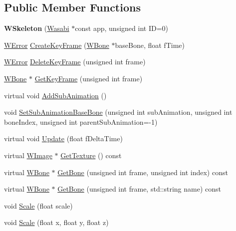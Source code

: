 \subsection*{Public Member Functions}
\begin{DoxyCompactItemize}
\item 
{\bfseries W\+Skeleton} (\hyperlink{class_wasabi}{Wasabi} $\ast$const app, unsigned int ID=0)\hypertarget{class_w_skeleton_ae21c72daeb9f7d5fe33c2a00b0fcf188}{}\label{class_w_skeleton_ae21c72daeb9f7d5fe33c2a00b0fcf188}

\item 
\hyperlink{class_w_error}{W\+Error} \hyperlink{class_w_skeleton_a9e4fbd0755c9e81d18b5c967353585d1}{Create\+Key\+Frame} (\hyperlink{class_w_bone}{W\+Bone} $\ast$base\+Bone, float f\+Time)
\item 
\hyperlink{class_w_error}{W\+Error} \hyperlink{class_w_skeleton_a7ef6ce4bf8ff72030cd9fcaf2657b417}{Delete\+Key\+Frame} (unsigned int frame)
\item 
\hyperlink{class_w_bone}{W\+Bone} $\ast$ \hyperlink{class_w_skeleton_a3f170e9e19601da0967ad54a09fb501f}{Get\+Key\+Frame} (unsigned int frame)
\item 
virtual void \hyperlink{class_w_skeleton_af8de1fd3b0d620873ae0341058441d9a}{Add\+Sub\+Animation} ()
\item 
void \hyperlink{class_w_skeleton_a3e2be1a8bda4cd0dbb61778e3a7866e9}{Set\+Sub\+Animation\+Base\+Bone} (unsigned int sub\+Animation, unsigned int bone\+Index, unsigned int parent\+Sub\+Animation=-\/1)
\item 
virtual void \hyperlink{class_w_skeleton_a894e87b86e90c3883a9467177c0d0077}{Update} (float f\+Delta\+Time)
\item 
virtual \hyperlink{class_w_image}{W\+Image} $\ast$ \hyperlink{class_w_skeleton_a43627eefdaa0f04fe365e5068b64f10a}{Get\+Texture} () const 
\item 
virtual \hyperlink{class_w_bone}{W\+Bone} $\ast$ \hyperlink{class_w_skeleton_afddaae186252abb835c01422e1e3c073}{Get\+Bone} (unsigned int frame, unsigned int index) const 
\item 
virtual \hyperlink{class_w_bone}{W\+Bone} $\ast$ \hyperlink{class_w_skeleton_a61341f24782103faace05e7f497965fb}{Get\+Bone} (unsigned int frame, std\+::string name) const 
\item 
void \hyperlink{class_w_skeleton_a43bd01e7af7f342ec9aeb26500da6878}{Scale} (float scale)
\item 
void \hyperlink{class_w_skeleton_ac67c115823b22c8438f78c4e3aaf97a3}{Scale} (float x, float y, float z)

\end{DoxyCompactItemize}
